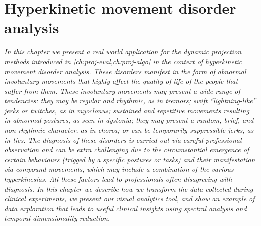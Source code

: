 \chapter{Hyperkinetic movement disorder analysis}
\label{ch:nemo}

\textit{
In this chapter we present a real world application for the dynamic projection methods introduced in \cref{ch:proj-eval,ch:proj-algo} in the context of hyperkinetic movement disorder analysis. These disorders manifest in the form of abnormal involuntary movements that highly affect the quality of life of the people that suffer from them. These involuntary movements may present a wide range of tendencies: they may be regular and rhythmic, as in tremors; swift ``lightning-like'' jerks or twitches, as in myoclonus; sustained and repetitive movements resulting in abnormal postures, as seen in dystonia; they may present a random, brief, and non-rhythmic character, as in chorea; or can be temporarily suppressible jerks, as in tics.
The diagnosis of these disorders is carried out via careful professional observation and can be extra challenging due to the circumstantial emergence of certain behaviours (trigged by a specific postures or tasks) and their manifestation via compound movements, which may include a combination of the various hyperkinesias. All these factors lead to professionals often disagreeing with diagnosis. 
In this chapter we describe how we transform the data collected during clinical experiments, we present our visual analytics tool, and show an example of data exploration that leads to useful clinical insights using spectral analysis and temporal dimensionality reduction.
}

\vspace{5mm} %


